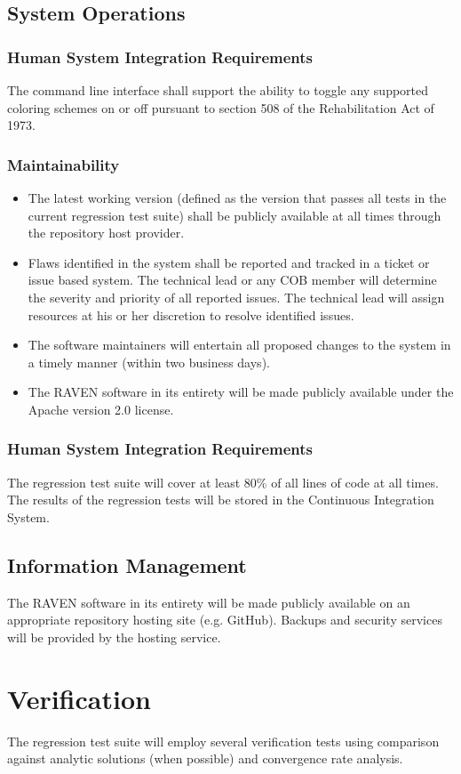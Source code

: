 \subsection{System Operations}
\subsubsection{Human System Integration Requirements}
The command line interface shall support the ability to toggle any supported coloring schemes on or off pursuant to section 
508 of the Rehabilitation Act of 1973.
\subsubsection{Maintainability}
\begin{itemize}
  \item The latest working version (defined as the version that passes all tests in the current regression test suite) shall be 
           publicly available at all times through the repository host provider.
  \item  Flaws identified in the system shall be reported and tracked in a ticket or issue based system. The technical lead or 
            any COB member will 
            determine the severity and priority of all reported issues. The technical lead will assign resources at his or her 
            discretion to resolve identified issues.
  \item  The software maintainers will entertain all proposed changes to the system in a timely manner 
           (within two business days).        
  \item  The RAVEN software in its entirety will be made publicly available under the Apache version 2.0 license.     
\end{itemize}
\subsubsection{Human System Integration Requirements}
The regression test suite will cover at least 80\% of all lines of code at all times. 
The results of the regression tests will be stored in the Continuous Integration System.

\subsection{Information Management}
The RAVEN software in its entirety will be made publicly available on an appropriate repository hosting site (e.g. GitHub).
Backups and security services will be provided by the hosting service.

\section{Verification}
The regression test suite will employ several verification tests using comparison against analytic 
solutions (when possible) and convergence rate analysis. 